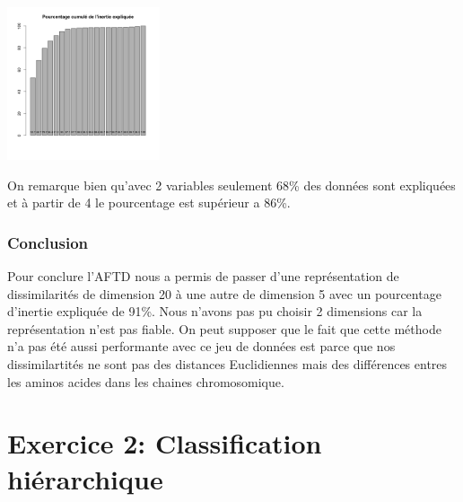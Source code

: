 \documentclass[10pt]{article}
\begin{document}
		\begin{center}
		\includegraphics[width=45mm]{Figures/Mutations2_1/barplot.png}
		\label{fig:mutations_barplot}
	\end{center}
	On remarque bien qu'avec 2 variables seulement 68\%  des données sont expliquées et à partir de 4  le pourcentage est supérieur a 86\%.
	
	\subsubsection{Conclusion}
	Pour conclure l'AFTD nous a permis de passer d'une représentation de dissimilarités de dimension 20 à une autre de dimension 5 avec un pourcentage d'inertie expliquée de 91\%. Nous n'avons pas pu choisir 2 dimensions car la représentation n'est pas fiable. On peut supposer que le fait que cette méthode n'a pas été aussi performante avec ce jeu de données est parce que nos dissimilartités ne sont pas des  distances Euclidiennes mais des différences entres les aminos acides dans les chaines chromosomique.
	
	
	

	\section{ Exercice 2: Classification hiérarchique}
\end{document}
